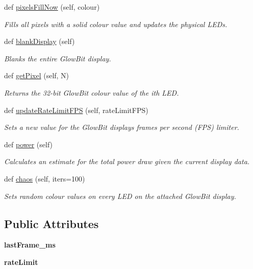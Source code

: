 \begin{DoxyCompactItemize}
def \hyperlink{classglowbit_1_1glowbit_a2aae728fcc6e8cdfe5c745ac0a7d308d}{pixels\+Fill\+Now} (self, colour)
\begin{DoxyCompactList}\small\item\em Fills all pixels with a solid colour value and updates the physical L\+E\+Ds. \end{DoxyCompactList}\item 
def \hyperlink{classglowbit_1_1glowbit_ad3ace3e4d58bc9dadf62c1306aff2464}{blank\+Display} (self)
\begin{DoxyCompactList}\small\item\em Blanks the entire Glow\+Bit display. \end{DoxyCompactList}\item 
def \hyperlink{classglowbit_1_1glowbit_a0f15a8907f807ed1af905854fedbbc60}{get\+Pixel} (self, N)
\begin{DoxyCompactList}\small\item\em Returns the 32-\/bit Glow\+Bit colour value of the i\textquotesingle{}th L\+ED. \end{DoxyCompactList}\item 
def \hyperlink{classglowbit_1_1glowbit_a7f72cb0878a688aa6181d4632428da09}{update\+Rate\+Limit\+F\+PS} (self, rate\+Limit\+F\+PS)
\begin{DoxyCompactList}\small\item\em Sets a new value for the Glow\+Bit display\textquotesingle{}s frames per second (F\+PS) limiter. \end{DoxyCompactList}\item 
def \hyperlink{classglowbit_1_1glowbit_a0f41651679b85f423017f309bd477666}{power} (self)
\begin{DoxyCompactList}\small\item\em Calculates an estimate for the total power draw given the current display data. \end{DoxyCompactList}\item 
def \hyperlink{classglowbit_1_1glowbit_ae95bb7e0ee556e02d918f376cffcb9ce}{chaos} (self, iters=100)
\begin{DoxyCompactList}\small\item\em Sets random colour values on every L\+ED on the attached Glow\+Bit display. \end{DoxyCompactList}\end{DoxyCompactItemize}
\subsection*{Public Attributes}
\begin{DoxyCompactItemize}
\item 
\mbox{\label{classglowbit_1_1glowbit_a5f14ddb9b3ec9a848c050b28d27ced9e}} 
{\bfseries last\+Frame\+\_\+ms}
\item 
\mbox{\label{classglowbit_1_1glowbit_a69bf20e5a054c0cf8656986b07048851}} 
{\bfseries rate\+Limit}
\end{DoxyCompactItemize}
